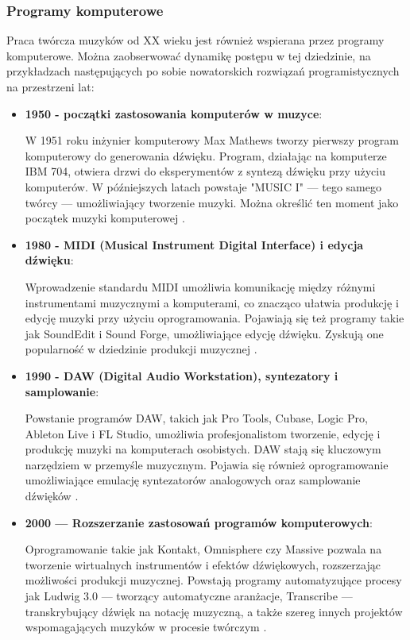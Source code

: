 \subsubsection{Programy komputerowe}
Praca twórcza muzyków od XX wieku jest również wspierana przez programy komputerowe. Można zaobserwować dynamikę postępu
w tej dziedzinie, na przykładzach następujących po sobie nowatorskich rozwiązań programistycznych na przestrzeni lat:
\begin{itemize}
	\item \textbf{1950 - początki zastosowania komputerów w muzyce}:

	      W 1951 roku inżynier komputerowy Max Mathews tworzy pierwszy program komputerowy do generowania dźwięku.
	      Program, działając na komputerze IBM 704, otwiera drzwi do eksperymentów z syntezą dźwięku przy użyciu komputerów.
	      W późniejszych latach powstaje "MUSIC I" — tego samego twórcy — umożliwiający tworzenie muzyki.
	      Można określić ten moment jako początek muzyki komputerowej \cite{50}.
	\item \textbf{1980 - MIDI (Musical Instrument Digital Interface) i edycja dźwięku}:

	      Wprowadzenie standardu MIDI umożliwia komunikację między różnymi instrumentami muzycznymi a komputerami,
	      co znacząco ułatwia produkcję i edycję muzyki przy użyciu oprogramowania.
	      Pojawiają się też programy takie jak SoundEdit i Sound Forge, umożliwiające edycję dźwięku.
	      Zyskują one popularność w dziedzinie produkcji muzycznej \cite{90}.
	\item \textbf{1990 - DAW (Digital Audio Workstation), syntezatory i samplowanie}:

	      Powstanie programów DAW, takich jak Pro Tools, Cubase, Logic Pro, Ableton Live i FL Studio,
	      umożliwia profesjonalistom tworzenie, edycję i produkcję muzyki na komputerach osobistych.
	      DAW stają się kluczowym narzędziem w przemyśle muzycznym.
	      Pojawia się również oprogramowanie umożliwiające emulację syntezatorów analogowych oraz samplowanie dźwięków \cite{90}.
	\item \textbf{2000 — Rozszerzanie zastosowań programów komputerowych}:

	      Oprogramowanie takie jak Kontakt, Omnisphere czy Massive pozwala na tworzenie wirtualnych instrumentów i efektów
	      dźwiękowych, rozszerzając możliwości produkcji muzycznej.
	      Powstają programy automatyzujące procesy jak Ludwig 3.0 — tworzący automatyczne aranżacje, Transcribe — transkrybujący
	      dźwięk na notację muzyczną, a także szereg innych projektów wspomagających muzyków w procesie twórczym \cite{00}.
\end{itemize}

